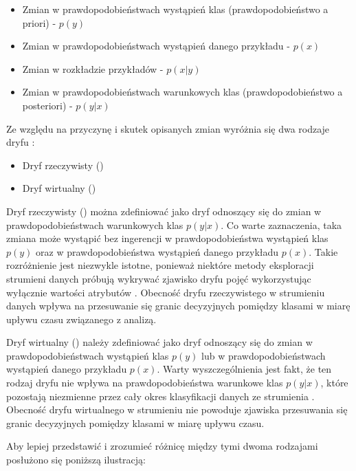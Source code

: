 \begin{itemize}
    \item Zmian w prawdopodobieństwach wystąpień klas (prawdopodobieństwo a priori) - $p(y)$
    \item Zmian w prawdopodobieństwach wystąpień danego przykładu - $p(x)$
    \item Zmian w rozkładzie przykładów - $p(x|y)$
    \item Zmian w prawdopodobieństwach warunkowych klas (prawdopodobieństwo a posteriori) - $p(y|x)$
\end{itemize}

\noindent Ze względu na przyczynę i skutek opisanych zmian wyróżnia się dwa rodzaje dryfu \cite{Article:DriftGama2}:

\begin{itemize}
    \item Dryf rzeczywisty ()
    \item Dryf wirtualny ()
\end{itemize}

\noindent Dryf rzeczywisty () można zdefiniować jako dryf odnoszący się do zmian w prawdopodobieństwach warunkowych klas $p(y|x)$. Co warte zaznaczenia, taka zmiana może wystąpić bez ingerencji w prawdopodobieństwa wystąpień klas $p(y)$ oraz w prawdopodobieństwa wystąpień danego przykładu $p(x)$. Takie rozróżnienie jest niezwykle istotne, ponieważ niektóre metody eksploracji strumieni danych próbują wykrywać zjawisko dryfu pojęć wykorzystując wyłącznie wartości atrybutów \cite{Article:RealDrift}. Obecność dryfu rzeczywistego w strumieniu danych wpływa na przesuwanie się granic decyzyjnych pomiędzy klasami w miarę upływu czasu związanego z analizą.

Dryf wirtualny () należy zdefiniować jako dryf odnoszący się do zmian w prawdopodobieństwach wystąpień klas $p(y)$ lub w prawdopodobieństwach wystąpień danego przykładu $p(x)$. Warty wyszczególnienia jest fakt, że ten rodzaj dryfu nie wpływa na prawdopodobieństwa warunkowe klas $p(y|x)$, które pozostają niezmienne przez cały okres klasyfikacji danych ze strumienia \cite{Article:VirtualDrift}. Obecność dryfu wirtualnego w strumieniu nie powoduje zjawiska przesuwania się granic decyzyjnych pomiędzy klasami w miarę upływu czasu.

\newpage

Aby lepiej przedstawić i zrozumieć różnicę między tymi dwoma rodzajami posłużono się poniższą ilustracją:


